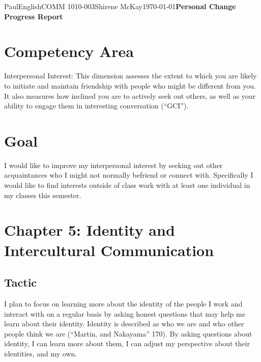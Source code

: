 \documentclass[12pt,letterpaper]{article}
\begin{document}
\begin{mla}{Paul}{English}{COMM 1010-003}{Shirene
    McKay}{\today}{\textbf{Personal Change Progress Report}}

\section{Competency Area}

Interpersonal Interest: This dimension assesses the extent to which
you are likely to initiate and maintain friendship with people who
might be different from you. It also measures how inclined you are to
actively seek out others, as well as your ability to engage them in
interesting conversation (``GCI'').

\section{Goal}

I would like to improve my interpersonal interest by seeking out other
acquaintances who I might not normally befriend or connect with.
Specifically I would like to find interests outside of class work with
at least one individual in my classes this semester.

\section{Chapter 5: Identity and Intercultural Communication}
\subsection{Tactic}
I plan to focus on learning more about the identity of the people I work and
interact with on a regular basis by asking honest questions that may
help me learn about their identity. Identity is described as who we are and who other people think we are (``Martin, and Nakayama'' 170). By asking questions about identity, I can learn more about them, I can adjust my perspective about their identities, and my own.


\end{mla}
\end{document}

